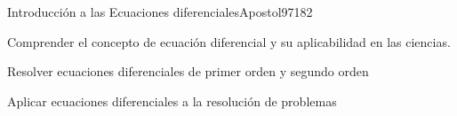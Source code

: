 \begin{syllabus}
\begin{unit}{Introducción a las Ecuaciones diferenciales}{Apostol97}{18}{2}
   \begin{unitgoals}
      \item Comprender el concepto de ecuación diferencial y su aplicabilidad en las ciencias.
      \item Resolver ecuaciones diferenciales de primer orden y segundo orden
      \item Aplicar ecuaciones diferenciales a la resolución de problemas
      \end{unitgoals}
\end{unit}



\begin{coursebibliography}
\end{coursebibliography}

\end{syllabus}
